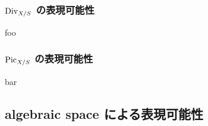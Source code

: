 \subsubsection{$\mathrm{Div}_{X / S}$ の表現可能性}

foo

\subsubsection{$\mathrm{Pic}_{X / S}$ の表現可能性}

bar


\subsection{algebraic space による表現可能性}